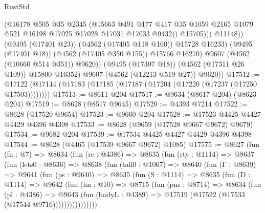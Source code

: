 \begin{lexlean}{RustStd}
\begin{coremodule}
                            (@16178
                              @505
                              @35
                              @2345
                              (@15663
                                @491
                                @177
                                @417
                                @35
                                @1059
                                @2165
                                @1079
                                @521
                                @16198
                                @17025
                                @17028
                                @17031
                                @17033
                                @9432))
                            @15705)))
                      @11148))
                  (@9495 (@17401 @23))
                  (@4562 (@17405 @118 @160))
                  @15728
                  @16233)
                (@9495 (@17401 @18))
                (@4562 (@17405 @350 @155))
                @15766
                @16270)
              @9607
              (@4562 (@10660 @514 @351))
              @9620))
          (@9495 (@17307 @18))
          (@4562 (@17311 @26 @109))
          @15800
          @16352)
        @9607
        (@4562 (@12213 @519 @27))
        @9620))
@17512 := @17122 (@17144 (@17183 (@17185 (@17187 (@17204 (@17220 (@17237 (@17250 @17503))))))))
@17513 := @8611 @204
@17517 := @9634 (@8617 @204) (@8623 @204)
@17519 := @8628 (@8517 @9645)
@17520 := @4393 @7214
@17522 := @8628 (@17520 @9654)
@17523 := @9660 @204
@17528 := @17523 @4425 @4427 @4429 @4396 @4398
@17533 := @8628 (@9659 (@17528 @9667 @9672) @9679)
@17534 := @9682 @204
@17539 := @17534 @4425 @4427 @4429 @4396 @4398
@17544 := @8628 (@4465 (@17539 @9667 @9672) @1085)
@17575 := @8627
    (fun (fn : @7) =>
    @8634
      (fun (rc : @4386) =>
      @8635
        (fun (rty : @1114) =>
        @8637
          (fun (lets0 : @8636) =>
          @8638
            (fun (tail0 : @1067) =>
            @8640
              (fun (Γ : @8639) =>
              @9641
                (fun (ps : @9640) =>
                @8635
                  (fun (S : @1114) =>
                  @8635
                    (fun (D : @1114) =>
                    @9642
                      (fun (hn : @10) =>
                      @8715
                        (fun (pns : @8714) =>
                        @8634
                          (fun (pl : @4386) =>
                          @9643
                            (fun (bodyL : @4389) =>
                            @17519 (@17522 (@17533 (@17544 @9716))))))))))))))))

\end{coremodule}
\end{lexlean}
